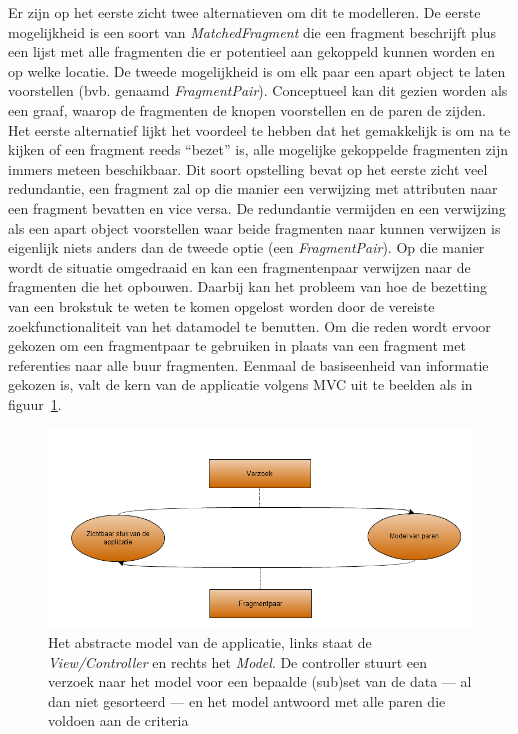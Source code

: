 Er zijn op het eerste zicht twee alternatieven om dit te modelleren. De eerste mogelijkheid is een soort van \emph{MatchedFragment} die een fragment beschrijft plus een lijst met alle fragmenten die er potentieel aan gekoppeld kunnen worden en op welke locatie. De tweede mogelijkheid is om elk paar een apart object te laten voorstellen (bvb. genaamd \emph{FragmentPair}). Conceptueel kan dit gezien worden als een graaf, waarop de fragmenten de knopen voorstellen en de paren de zijden. Het eerste alternatief lijkt het voordeel te hebben dat het gemakkelijk is om na te kijken of een fragment reeds ``bezet'' is, alle mogelijke gekoppelde fragmenten zijn immers meteen beschikbaar. Dit soort opstelling bevat op het eerste zicht veel redundantie, een fragment zal op die manier een verwijzing met attributen naar een fragment bevatten en vice versa. De redundantie vermijden en een verwijzing als een apart object voorstellen waar beide fragmenten naar kunnen verwijzen is eigenlijk niets anders dan de tweede optie (een \emph{FragmentPair}). Op die manier wordt de situatie omgedraaid en kan een fragmentenpaar verwijzen naar de fragmenten die het opbouwen. Daarbij kan het probleem van hoe de bezetting van een brokstuk te weten te komen opgelost worden door de vereiste zoekfunctionaliteit van het datamodel te benutten. Om die reden wordt ervoor gekozen om een fragmentpaar te gebruiken in plaats van een fragment met referenties naar alle buur fragmenten. Eenmaal de basiseenheid van informatie gekozen is, valt de kern van de applicatie volgens MVC uit te beelden als in figuur~\ref{fig:basicprogramflow}.\\

\begin{figure}[ht]
	\begin{center}
		\includegraphics[width=1.0\columnwidth]{images/BasicExecutionFlow.png}
		\caption{Het abstracte model van de applicatie, links staat de \emph{View/Controller} en rechts het \emph{Model}. De controller stuurt een verzoek naar het model voor een bepaalde (sub)set van de data --- al dan niet gesorteerd --- en het model antwoord met alle paren die voldoen aan de criteria}
		\label{fig:basicprogramflow}
	\end{center}
\end{figure}

